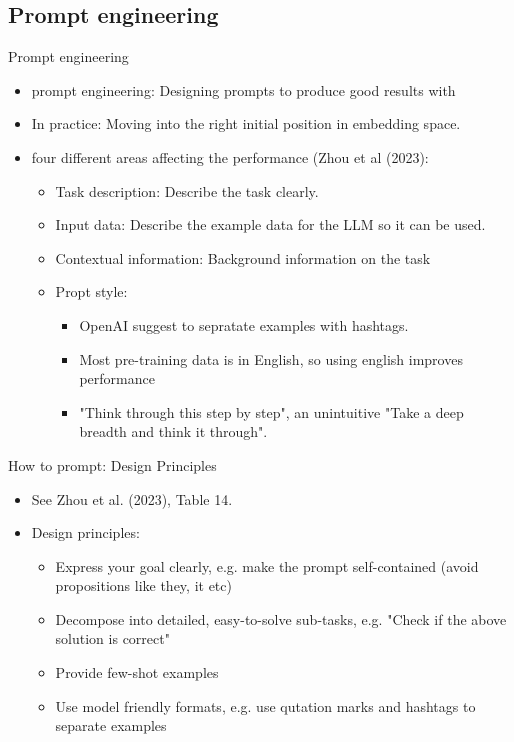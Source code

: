 \documentclass[10pt]{beamer}
\begin{document}
\subsection{Prompt engineering}

\begin{frame}{Prompt engineering}

\begin{itemize}
\item prompt engineering: Designing prompts to produce good results with 
\item In practice: Moving into the right initial position in embedding space.
\item four different areas affecting the performance (Zhou et al (2023):
\begin{itemize}
\item Task description: Describe the task clearly.
\item Input data: Describe the example data for the LLM so it can be used.
\item Contextual information: Background information on the task
\item Propt style:
\begin{itemize}
\item OpenAI suggest to sepratate examples with hashtags.
\item Most pre-training data is in English, so using english improves performance
\item "Think through this step by step", an unintuitive "Take a deep breadth and think it through".
\end{itemize}
\end{itemize}
\end{itemize}

\end{frame}


\begin{frame}{How to prompt: Design Principles}

\begin{itemize}
\item See Zhou et al. (2023), Table 14.
\item Design principles:
\begin{itemize}
\item Express your goal clearly, e.g. make the prompt self-contained (avoid propositions like they, it etc)
\item Decompose into detailed, easy-to-solve sub-tasks, e.g. "Check if the above solution is correct"
\item Provide few-shot examples
\item Use model friendly formats, e.g. use qutation marks and hashtags to separate examples
\end{itemize}
\end{itemize}

\end{frame}





\end{document}
